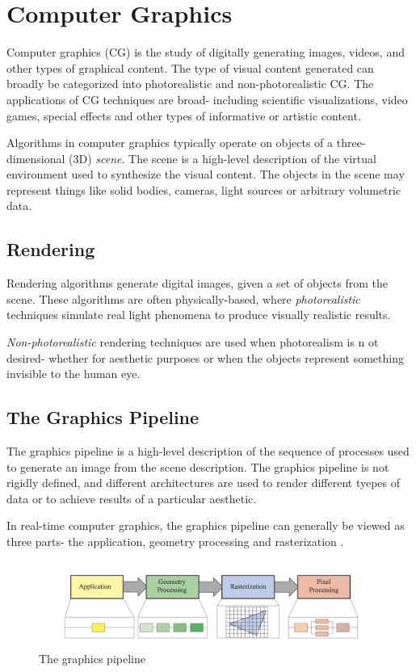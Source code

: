 \documentclass{article}
\begin{document}
\section{Computer Graphics}
Computer graphics (CG) is the study of digitally generating images, videos, and other types of graphical content.
The type of visual content generated can broadly be categorized into photorealistic and non-photorealistic CG.
The applications of CG techniques are broad- including scientific visualizations, video games, special effects and other types of informative or artistic content.

Algorithms in computer graphics typically operate on objects of a three-dimensional (3D) \textit{scene}. The scene is a high-level description of the virtual environment used to synthesize the visual content.
The objects in the scene may represent things like solid bodies, cameras, light sources or arbitrary volumetric data.

\subsection{Rendering}
Rendering algorithms generate digital images, given a set of objects from the scene. These algorithms
are often physically-based, where \textit{photorealistic} techniques simulate real light phenomena to produce visually realistic results. 


\textit{Non-photorealistic} rendering techniques are used when photorealism is n    ot desired- whether for aesthetic purposes or when the objects represent something
invisible to the human eye. 

\subsection{The Graphics Pipeline}
The graphics pipeline is a high-level description of the sequence of processes used to 
generate an image from the scene description. The graphics pipeline is not rigidly defined,
and different architectures are used to render different tyepes of data or to achieve results of a particular aesthetic.

In real-time computer graphics, the graphics pipeline can generally be viewed as three parts- the application, geometry processing and rasterization \cite{RealTimeRendering}.

\begin{figure}[tbh]
    \centering
    \includegraphics[width=1.0\textwidth]{images/graphics_pipeline.png}
    \caption{The graphics pipeline \cite{RealTimeRendering}}
    \label{fig:pipelineRealTimeRendering}
\end{figure}
\end{document}
